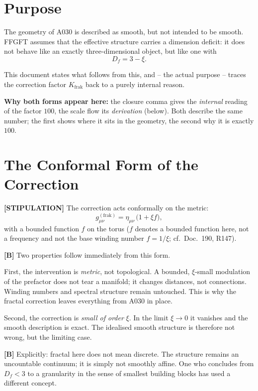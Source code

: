 \section{Purpose}

The geometry of A030 is described as smooth, but not intended to be smooth.
FFGFT assumes that the effective structure carries a dimension deficit: it
does not behave like an exactly three-dimensional object, but like one with
\[
  D_f = 3 - \xi .
\]

This document states what follows from this, and -- the actual purpose --
traces the correction factor $K_\text{frak}$ back to a purely internal reason.

\textbf{Why both forms appear here:} the closure comma gives the \emph{internal}
reading of the factor $100$, the scale flow its \emph{derivation} (below). Both
describe the same number; the first shows where it sits in the geometry, the
second why it is exactly $100$.

\section{The Conformal Form of the Correction}

\textbf{[STIPULATION]} The correction acts conformally on the metric:
\[
  g_{\mu\nu}^{(\text{frak})} = \eta_{\mu\nu}\,\bigl(1 + \xi f\bigr),
\]
with a bounded function $f$ on the torus ($f$ denotes a bounded function here,
not a frequency and not the base winding number $f = 1/\xi$; cf.\ Doc.~190, R147).

\textbf{[B]} Two properties follow immediately from this form.

First, the intervention is \emph{metric}, not topological. A bounded, $\xi$-small
modulation of the prefactor does not tear a manifold; it changes distances, not
connections. Winding numbers and spectral structure remain untouched. This is
why the fractal correction leaves everything from A030 in place.

Second, the correction is \emph{small of order} $\xi$. In the limit $\xi\to 0$
it vanishes and the smooth description is exact. The idealised smooth structure
is therefore not wrong, but the limiting case.

\textbf{[B]} Explicitly: fractal here does not mean discrete. The structure
remains an uncountable continuum; it is simply not smoothly affine. One who
concludes from $D_f<3$ to a granularity in the sense of smallest building blocks
has used a different concept.

